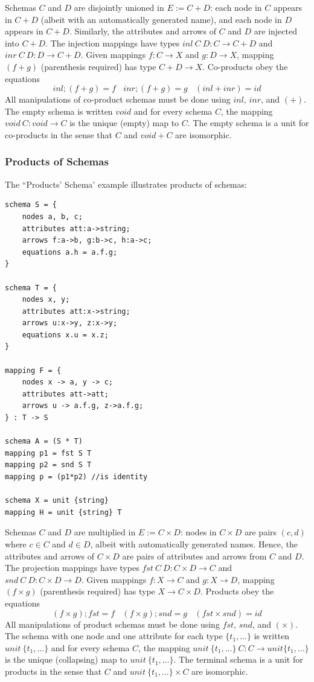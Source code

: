 \documentclass[12pt]{article}
\begin{document}
Schemas $C$ and $D$ are disjointly unioned in $E := C + D$: each node in $C$ appears in $C+D$ (albeit with an automatically generated name), and each node in $D$ appears in $C+D$.  Similarly, the attributes and arrows of $C$ and $D$ are injected into $C+D$.  The injection mappings have types $inl \ C \ D : C \to C+D$ and $inr \ C \ D : D \to C+D$.  Given mappings $f : C \to X$ and $g : D \to X$, mapping $(f + g)$ (parenthesis required) has type $C+D \to X$.  Co-products obey the equations
$$
inl ; (f + g) = f \ \ \ \ inr ; (f + g) = g \ \ \ \ (inl + inr) = id
$$
All manipulations of co-product schemas must be done using $inl$, $inr$, and $(+)$.  The empty schema is written $void$ and for every schema $C$, the mapping $void \ C : void \to C$ is the unique (empty) map to $C$.  The empty schema is a unit for co-products in the sense that $C$ and $void + C$ are isomorphic.

\subsubsection{Products of Schemas}
The ``Products' Schema' example illustrates products of schemas:
\begin{verbatim}
schema S = {
	nodes a, b, c;
	attributes att:a->string;
	arrows f:a->b, g:b->c, h:a->c;
	equations a.h = a.f.g;
}

schema T = {
	nodes x, y;
	attributes att:x->string;
	arrows u:x->y, z:x->y;
	equations x.u = x.z;
}

mapping F = {
	nodes x -> a, y -> c;
	attributes att->att;
	arrows u -> a.f.g, z->a.f.g;
} : T -> S 

schema A = (S * T)
mapping p1 = fst S T
mapping p2 = snd S T
mapping p = (p1*p2) //is identity

schema X = unit {string}
mapping H = unit {string} T
\end{verbatim}
 Schemas $C$ and $D$ are multiplied in $E := C \times D$: nodes in $C \times D$ are pairs $(c,d)$ where $c \in C$ and $d \in D$, albeit with automatically generated names.  Hence, the attributes and arrows of $C\times D$ are pairs of attributes and arrows from $C$ and $D$.  The projection mappings have types $fst \ C \ D : C \times D \to C$ and $snd \ C \ D : C \times D \to D$.  Given mappings $f : X \to C$ and $g : X \to D$, mapping $(f \times g)$ (parenthesis required) has type $X \to C\times D$.  Products obey the equations
$$
(f \times g) ; fst = f \ \ \ \ (f \times g) ; snd = g \ \ \ \ (fst \times snd) = id
$$
All manipulations of product schemas must be done using $fst$, $snd$, and $(\times)$.  The schema with one node and one attribute for each type $\{ t_1, \ldots \}$ is written $unit \ \{ t_1, \ldots \}$ and for every schema $C$, the mapping $unit \ \{t_1, \ldots \} \ C : C \to unit \{ t_1, \ldots\}$ is the unique (collapsing) map to $unit \ \{t_1, \ldots\}$.  The terminal schema is a unit for products in the sense that $C$ and $unit \ \{t_1, \ldots \} \times C$ are isomorphic.
\end{document}
